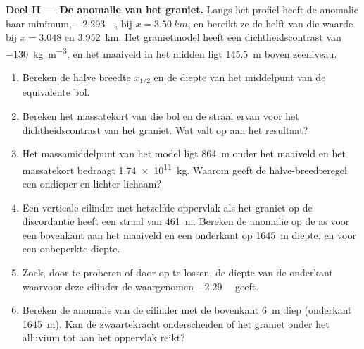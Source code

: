 \begin{problem}
\medskip\noindent\textbf{Deel II --- De anomalie van het graniet.} Langs
het profiel heeft de anomalie haar minimum, \qty{-2.293}{\milli\gal}, bij
$x = \qty{3.50}{km}$, en bereikt ze de helft van die waarde bij $x = 3.048$ en
\qty{3.952}{km}. Het granietmodel heeft een dichtheidscontrast van
\qty{-130}{kg.m^{-3}}, en het maaiveld in het midden ligt \qty{145.5}{m}
boven zeeniveau.
\begin{enumerate}[resume]
\item Bereken de halve breedte $x_{1/2}$ en de diepte van het middelpunt van
  de equivalente bol.
\item Bereken het massatekort van die bol en de straal ervan voor het
  dichtheidscontrast van het graniet. Wat valt op aan het resultaat?
\item Het massamiddelpunt van het model ligt \qty{864}{m} onder het maaiveld en
  het massatekort bedraagt \qty{1.74e11}{kg}. Waarom geeft de halve-breedteregel een
  ondieper en lichter lichaam?
\item Een verticale cilinder met hetzelfde oppervlak als het graniet op de
  discordantie heeft een straal van \qty{461}{m}. Bereken de anomalie op de as
  voor een bovenkant aan het maaiveld en een onderkant op \qty{1645}{m} diepte, en voor
  een onbeperkte diepte.
\item Zoek, door te proberen of door op te lossen, de diepte van de onderkant waarvoor
  deze cilinder de waargenomen \qty{-2.29}{\milli\gal} geeft.
\item Bereken de anomalie van de cilinder met de bovenkant \qty{6}{m} diep
  (onderkant \qty{1645}{m}). Kan de zwaartekracht onderscheiden of het graniet
  onder het alluvium tot aan het oppervlak reikt?
\end{enumerate}


\end{problem}
